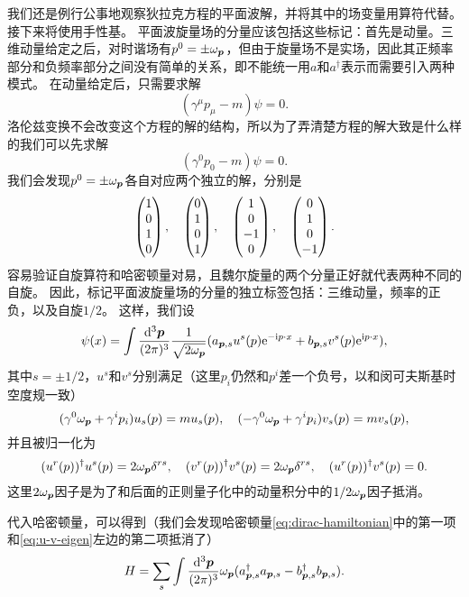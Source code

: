 \documentclass[hyperref, UTF8, a4paper]{ctexart}
\newcommand*{\ii}{\mathrm{i}}
\newcommand*{\ee}{\mathrm{e}}
\begin{document}
我们还是例行公事地观察狄拉克方程的平面波解，并将其中的场变量用算符代替。接下来将使用手性基。
平面波旋量场的分量应该包括这些标记：首先是动量。三维动量给定之后，对时谐场有$p^0 = \pm \omega_{\vb*{p}}$，但由于旋量场不是实场，因此其正频率部分和负频率部分之间没有简单的关系，即不能统一用$a$和$a^\dagger$表示而需要引入两种模式。
在动量给定后，只需要求解
\[
    (\gamma^\mu p_\mu - m) \psi = 0.
\]
洛伦兹变换不会改变这个方程的解的结构，所以为了弄清楚方程的解大致是什么样的我们可以先求解
\[
    (\gamma^0 p_0 - m) \psi = 0.
\]
我们会发现$p^0 = \pm \omega_{\vb*{p}}$各自对应两个独立的解，分别是
\[
    \pmqty{1 \\ 0 \\ 1 \\ 0}, \quad \pmqty{0 \\ 1 \\ 0 \\ 1}, \quad \pmqty{1 \\ 0 \\ -1 \\ 0}, \quad \pmqty{0 \\ 1 \\ 0 \\ -1}.
\]
容易验证自旋算符和哈密顿量对易，且魏尔旋量的两个分量正好就代表两种不同的自旋。
因此，标记平面波旋量场的分量的独立标签包括：三维动量，频率的正负，以及自旋$1/2$。
这样，我们设
\begin{equation}
    \psi(x) = \int \frac{\dd[3]{\vb*{p}}}{(2\pi)^3} \frac{1}{\sqrt{2 \omega_{\vb*{p}}}} (a_{\vb*{p}, s} u^s(p) \ee^{-\ii p \cdot x} + b_{\vb*{p}, s} v^s(p) \ee^{\ii p \cdot x}),
\end{equation}
其中$s = \pm 1/2$，$u^s$和$v^s$分别满足（这里$p_i$仍然和$p^i$差一个负号，以和闵可夫斯基时空度规一致）
\begin{equation}
    (\gamma^0 \omega_{\vb*{p}} + \gamma^i p_i) u_s(p) = m u_s(p), \quad (- \gamma^0 \omega_{\vb*{p}} + \gamma^i p_i) v_s(p) = m v_s(p), 
    \label{eq:u-v-eigen}
\end{equation}
并且被归一化为
\begin{equation}
    (u^r(p))^\dagger u^s(p) = 2 \omega_{\vb*{p}} \delta^{rs}, \quad (v^r(p))^\dagger v^s(p) = 2 \omega_{\vb*{p}} \delta^{rs}, \quad (u^r(p))^\dagger v^s(p) = 0.
\end{equation}
这里$2\omega_{\vb*{p}}$因子是为了和后面的正则量子化中的动量积分中的$1/2\omega_{\vb*{p}}$因子抵消。

代入哈密顿量，可以得到（我们会发现哈密顿量\eqref{eq:dirac-hamiltonian}中的第一项和\eqref{eq:u-v-eigen}左边的第二项抵消了）
\[
    H = \sum_{s} \int \frac{\dd[3]{\vb*{p}}}{(2\pi)^3} \omega_{\vb*{p}} (a^\dagger_{\vb*{p}, s} a_{\vb*{p}, s} - b^\dagger_{\vb*{p}, s} b_{\vb*{p}, s}).
\]
\end{document}
